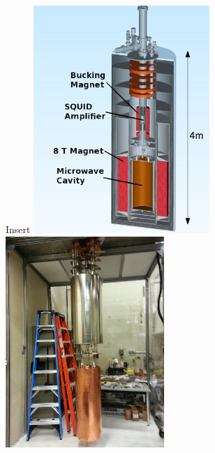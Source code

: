 \documentclass{beamer}
\begin{document}
\begin{frame}{Insert}
\includegraphics[width=0.5\textwidth]{admx_schematic} \quad \includegraphics[width=0.45\textwidth]{cavity_hanging}
\end{frame}
\end{document}
